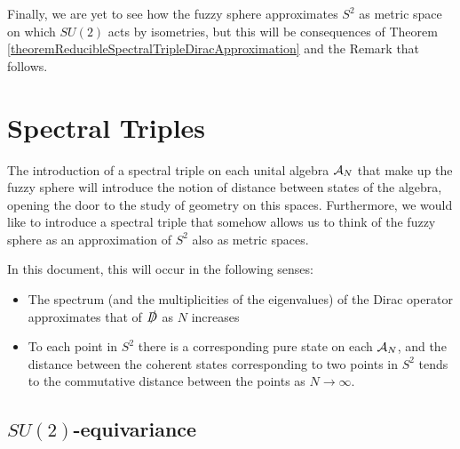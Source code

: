 Finally, we are yet to see how the fuzzy sphere approximates $S^2$ as metric space on which $SU(2)$ acts by isometries, but this will be consequences of Theorem \ref{theoremReducibleSpectralTripleDiracApproximation} and the Remark that follows.

\section{Spectral Triples}
\label{CHFSSectionSpectralTriples}

The introduction of a spectral triple on each unital algebra $\mathcal A_N$ that make up the fuzzy sphere will introduce the notion of distance between states of the algebra, opening the door to the study of geometry on this spaces. Furthermore, we would like to introduce a spectral triple that somehow allows us to think of the fuzzy sphere as an approximation of $S^2$ also as metric spaces. 

In this document, this will occur in the following senses:

    \begin{itemize}
    
    \item The spectrum (and the multiplicities of the eigenvalues) of the Dirac operator approximates that of $\slashed D$ as $N$ increases
    
    \item To each point in $S^2$ there is a corresponding pure state on each $\mathcal A_N$, and the distance between the coherent states corresponding to two points in $S^2$ tends to the commutative distance between the points as $N \to \infty$.
    
    \end{itemize}

\subsection{$SU(2)$-equivariance}



